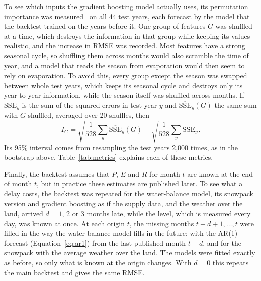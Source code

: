 \documentclass{article}
\begin{document}
To see which inputs the gradient boosting model actually uses, its permutation importance was
measured~\cite{breiman2001} on all 44 test years, each forecast by the model that the backtest
trained on the years before it. One group of features $G$ was shuffled at a time, which destroys
the information in that group while keeping its values realistic, and the increase in RMSE was
recorded. Most features have a strong seasonal cycle, so shuffling them across months would also
scramble the time of year, and a model that reads the season from evaporation would then seem to
rely on evaporation. To avoid this, every group except the season was swapped between whole test
years, which keeps its seasonal cycle and destroys only its year-to-year information, while the
season itself was shuffled across months. If $\mathrm{SSE}_y$ is the sum of the squared errors in
test year $y$ and $\overline{\mathrm{SSE}}_y(G)$ the same sum with $G$ shuffled, averaged over 20
shuffles, then
\begin{equation}
I_G = \sqrt{\frac{1}{528} \sum_{y} \overline{\mathrm{SSE}}_y(G)}
- \sqrt{\frac{1}{528} \sum_{y} \mathrm{SSE}_y}. \label{eq:perm}
\end{equation}
Its 95\% interval comes from resampling the test years 2,000 times, as in the bootstrap above.
Table~\ref{tab:metrics} explains each of these metrics.

Finally, the backtest assumes that $P$, $E$ and $R$ for month $t$ are known at the end of month
$t$, but in practice these estimates are published later. To see what a delay costs, the
backtest was repeated for the water-balance model, its snowpack version and gradient boosting as
if the supply data, and the weather over the land, arrived $d = 1$, 2 or 3 months late, while the
level, which is measured every day, was known at once. At each origin $t$, the missing months
$t-d+1, \dots, t$ were filled in the way the water-balance model fills in the future: with the
AR(1) forecast (Equation~\ref{eq:ar1}) from the last published month $t-d$, and for the snowpack
with the average weather over the land. The models were fitted exactly as before, so only what is
known at the origin changes. With $d = 0$ this repeats the main backtest and gives the same RMSE.
\end{document}
